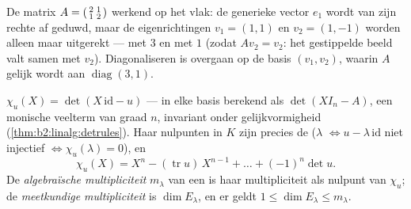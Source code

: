 \begin{omfigure}

{\small De matrix $A = \begin{psmallmatrix}2 & 1\\ 1 &
2\end{psmallmatrix}$ werkend op het vlak: de generieke vector $e_1$
wordt van zijn rechte af geduwd, maar de eigenrichtingen $v_1 =
(1,1)$ en $v_2 = (1,-1)$ worden alleen maar uitgerekt --- met $3$
en met $1$ (zodat $Av_2 = v_2$: het gestippelde beeld valt samen
met $v_2$). Diagonaliseren is overgaan op de basis $(v_1, v_2)$,
waarin $A$ gelijk wordt aan $\operatorname{diag}(3, 1)$.}
\end{omfigure}

\begin{definition}\label{def:b2:reduction:charpoly}
$\chi_u(X) = \det(X\,\mathrm{id} - u)$ --- in elke basis berekend als $\det(XI_n - A)$, een
monische veelterm van graad $n$, invariant onder gelijkvormigheid
(\cref{thm:b2:linalg:detrules}). Haar nulpunten in $K$ zijn precies
de  ($\lambda$  $\iff u -
\lambda\,\mathrm{id}$ niet injectief $\iff \chi_u(\lambda) = 0$),
en
\[
\chi_u(X) = X^n - (\operatorname{tr} u)\, X^{n-1} + \dots +
(-1)^n \det u .
\]
De \emph{algebraïsche multipliciteit} $m_\lambda$ van een  is haar
multipliciteit als nulpunt van $\chi_u$; de \emph{meetkundige
multipliciteit} is $\dim
E_\lambda$, en er geldt $1 \leq \dim E_\lambda \leq m_\lambda$.
\end{definition}

